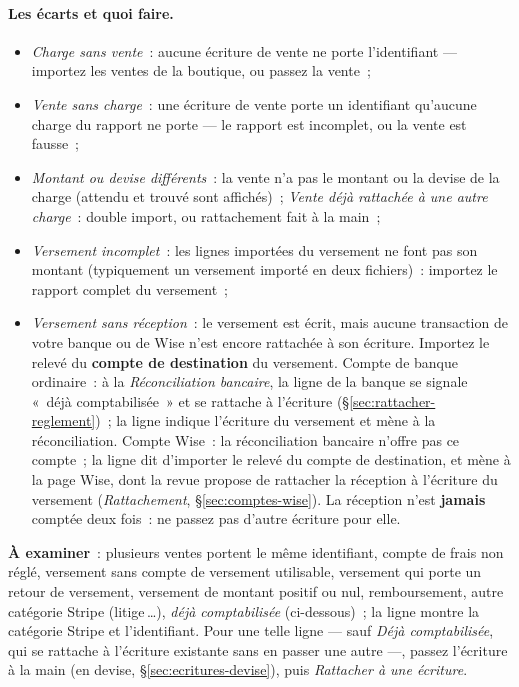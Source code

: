 \documentclass[a4paper,11pt,oneside]{article}
\begin{document}
\paragraph{Les écarts et quoi faire.}
\begin{itemize}
    \item \emph{Charge sans vente}~: aucune écriture de vente ne porte l'identifiant --- importez les ventes de la boutique, ou passez la vente~;
    \item \emph{Vente sans charge}~: une écriture de vente porte un identifiant qu'aucune charge du rapport ne porte --- le rapport est incomplet, ou la vente est fausse~;
    \item \emph{Montant ou devise différents}~: la vente n'a pas le montant ou la devise de la charge (attendu et trouvé sont affichés)~; \emph{Vente déjà rattachée à une autre charge}~: double import, ou rattachement fait à la main~;
    \item \emph{Versement incomplet}~: les lignes importées du versement ne font pas son montant (typiquement un versement importé en deux fichiers)~: importez le rapport complet du versement~;
    \item \emph{Versement sans réception}~: le versement est écrit, mais aucune transaction de votre banque ou de Wise n'est encore rattachée à son écriture. Importez le relevé du \textbf{compte de destination} du versement. Compte de banque ordinaire~: à la \emph{Réconciliation bancaire}, la ligne de la banque se signale «~déjà comptabilisée~» et se rattache à l'écriture (\S\ref{sec:rattacher-reglement})~; la ligne indique l'écriture du versement et mène à la réconciliation. Compte Wise~: la réconciliation bancaire n'offre pas ce compte~; la ligne dit d'importer le relevé du compte de destination, et mène à la page Wise, dont la revue propose de rattacher la réception à l'écriture du versement (\emph{Rattachement}, \S\ref{sec:comptes-wise}). La réception n'est \textbf{jamais} comptée deux fois~: ne passez pas d'autre écriture pour elle.
\end{itemize}
\textbf{À examiner}~: plusieurs ventes portent le même identifiant, compte de frais non réglé, versement sans compte de versement utilisable, versement qui porte un retour de versement, versement de montant positif ou nul, remboursement, autre catégorie Stripe (litige\,\dots), \emph{déjà comptabilisée} (ci-dessous)~; la ligne montre la catégorie Stripe et l'identifiant. Pour une telle ligne --- sauf \emph{Déjà comptabilisée}, qui se rattache à l'écriture existante sans en passer une autre ---, passez l'écriture à la main (en devise, \S\ref{sec:ecritures-devise}), puis \emph{Rattacher à une écriture}.
\end{document}
